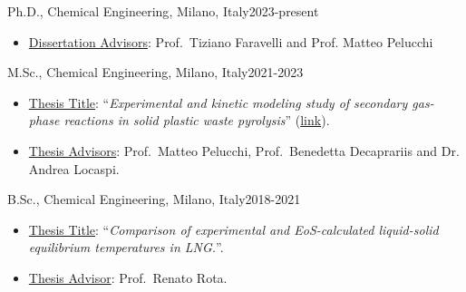 \begin{position}{Ph.D., Chemical Engineering}{\polimi, Milano, Italy}{2023-present}
   \begin{itemize}
      \item[ ] \ul{Dissertation Advisors}: Prof.\ Tiziano Faravelli  and Prof. Matteo Pelucchi
   \end{itemize}
\end{position}

\begin{position}{M.Sc., Chemical Engineering}{\polimi, Milano, Italy}{2021-2023}
   \begin{itemize}
      \item[ ] \ul{Thesis Title}: ``{\it Experimental and kinetic modeling study of secondary gas-phase reactions in solid plastic waste pyrolysis}'' (\href{https://hdl.handle.net/10589/210756}{link}).
      \item[ ] \ul{Thesis Advisors}: Prof.\ Matteo Pelucchi, Prof.\ Benedetta Decaprariis and Dr. Andrea Locaspi.
   \end{itemize}
\end{position}

\begin{position}{B.Sc., Chemical Engineering}{\polimi, Milano, Italy}{2018-2021}
   \begin{itemize}
      \item[ ] \ul{Thesis Title}: ``{\it Comparison of experimental and EoS-calculated liquid-solid equilibrium temperatures in LNG.}''.
      \item[ ] \ul{Thesis Advisor}: Prof.\ Renato Rota.
   \end{itemize}
\end{position}

